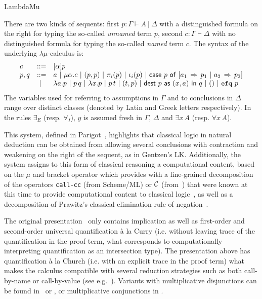 \begin{entry}{LambdaMu}
\begin{calculus}
\end{calculus}
\begin{clarifications}
There are two kinds of sequents: first $p: \Gamma \vdash A ~|~
\Delta$ with a distinguished formula on the right for typing the
so-called {\em unnamed} term $p$, second $c : \Gamma \vdash \Delta$ with no
distinguished formula for typing the so-called {\em named} term $c$.
The syntax of the underlying $\lambda\mu$-calculus 
is:
$$
\begin{array}{lll}
c & ::= & [\alpha]p\\
p,q  & ::= & a ~|~ \mu\alpha.c ~|~ (p,p) ~|~ \pi_i(p) ~|~ \iota_i(p) ~|~ \mathsf{case}~p~\mathsf{of}~[a_1\,\Rightarrow\,p_1~|~a_2\,\Rightarrow\,p_2] \\
& ~|~ & \lambda a.p ~|~ p\,q 
~|~ \lambda x.p ~|~ p\,t 
~|~ (t,p) ~|~ \mathsf{dest}~p~\mathsf{as}~(x,a)~\mathsf{in}~q
 ~|~ () ~|~ \texttt{efq}~{p}\\
\end{array}
$$ The variables used for referring to assumptions in $\Gamma$ and to
conclusions in $\Delta$ range over distinct classes (denoted by Latin
and Greek letters respectively). In the rules
$\exists_E$ (resp. $\forall_I$), $y$ is assumed fresh in $\Gamma$,
$\Delta$ and $\exists x\, A$ (resp. $\forall x\, A$).
\end{clarifications}

\begin{history}
This system, defined in Parigot~\cite{Parigot92},
highlights that classical logic in natural deduction can be obtained
from allowing several conclusions with contraction and weakening on
the right of the sequent, as in Gentzen's LK.  Additionally, the
system assigns to this form of classical reasoning a computational
content, based on the $\mu$ and bracket operator which provides with a
fine-grained decomposition
of the operators {\tt call-cc} (from Scheme/ML) or ${\cal C}$
(from~\cite{FelFriKohDub86}) that were known at this time to provide
computational content to classical logic~\cite{Griffin90}, as well as
a decomposition of Prawitz's classical elimination rule of
negation~\cite{Prawitz65}.

The original presentation~\cite{Parigot92} only contains implication
as well as first-order and second-order universal quantification \`a
la Curry (i.e. without leaving trace of the quantification in the
proof-term, what corresponds to computationally interpreting
quantification as an intersection type). The presentation above has
quantification \`a la Church (i.e. with an explicit trace in the proof
term) what makes the calculus compatible with several reduction
strategies such as both call-by-name or call-by-value (see
e.g.~\cite{HerbelinHdR}). Variants with multiplicative disjunctions
can be found in~\cite{Selinger01} or \cite{PymRitter01}, or
multiplicative conjunctions in \cite{HerbelinHdR}.


\end{history}
\end{entry}
